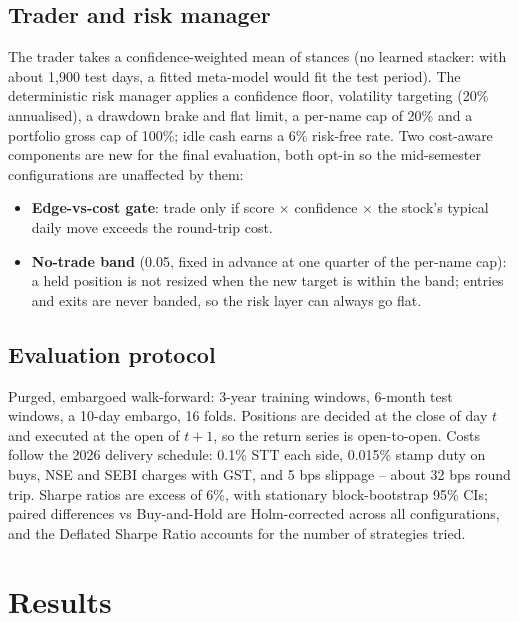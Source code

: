 \documentclass[11pt,a4paper]{article}
\begin{document}
\subsection{Trader and risk manager}
The trader takes a confidence-weighted mean of stances (no learned stacker: with about 1,900 test days, a fitted meta-model would fit the test period). The deterministic risk manager applies a confidence floor, volatility targeting (20\% annualised), a drawdown brake and flat limit, a per-name cap of 20\% and a portfolio gross cap of 100\%; idle cash earns a 6\% risk-free rate. Two cost-aware components are new for the final evaluation, both opt-in so the mid-semester configurations are unaffected by them:
\begin{itemize}
\item \textbf{Edge-vs-cost gate}: trade only if score $\times$ confidence $\times$ the stock's typical daily move exceeds the round-trip cost.
\item \textbf{No-trade band} (0.05, fixed in advance at one quarter of the per-name cap): a held position is not resized when the new target is within the band; entries and exits are never banded, so the risk layer can always go flat.
\end{itemize}
\subsection{Evaluation protocol}
Purged, embargoed walk-forward: 3-year training windows, 6-month test windows, a 10-day embargo, 16 folds. Positions are decided at the close of day $t$ and executed at the open of $t+1$, so the return series is open-to-open. Costs follow the 2026 delivery schedule: 0.1\% STT each side, 0.015\% stamp duty on buys, NSE and SEBI charges with GST, and 5 bps slippage -- about 32 bps round trip. Sharpe ratios are excess of 6\%, with stationary block-bootstrap 95\% CIs; paired differences vs Buy-and-Hold are Holm-corrected across all configurations, and the Deflated Sharpe Ratio accounts for the number of strategies tried.
\section{Results}
\end{document}
